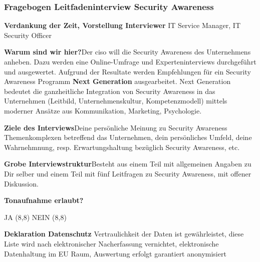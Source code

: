 \documentclass[../../main.tex]{subfiles}
\begin{document}
\subsubsection*{Fragebogen Leitfadeninterview Security Awareness}

\begin{itemize}
\setlength\itemsep{0mm}
  \item  \textbf{Verdankung der Zeit, Vorstellung Interviewer} \newline \footnotesize{IT Service Manager, IT Security Officer} \normalsize
  \item  \textbf{Warum sind wir hier?}\newline \footnotesize{Der \group \acrshort{ciso} will die Security Awareness des Unternehmens anheben. Dazu werden eine Online-Umfrage und Experteninterviews durchgeführt und ausgewertet. Aufgrund der Resultate werden Empfehlungen für ein Security Awareness Programm \textbf{Next Generation} ausgearbeitet. Next Generation bedeutet die ganzheitliche Integration von Security Awareness in das Unternehmen (Leitbild, Unternehmenskultur, Kompetenzmodell) mittels moderner Ansätze aus Kommunikation, Marketing, Psychologie.}  \normalsize
  \item \textbf{Ziele des Interviews}\newline \footnotesize{Deine persönliche Meinung zu Security Awareness Themenkomplexen betreffend das Unternehmen, dein persönliches Umfeld, deine Wahrnehmnung, resp. Erwartungshaltung bezüglich Security Awareness, etc. }  \normalsize
  \item \textbf{Grobe Interviewstruktur}\newline \footnotesize{Besteht aus einem Teil mit allgemeinen Angaben zu Dir selber und einem Teil mit fünf Leitfragen zu Security Awareness, mit offener Diskussion.}  \normalsize
  \item \textbf{Tonaufnahme erlaubt?}\newline \footnotesize{JA \framebox(8,8){}\hspace{1cm} NEIN \framebox(8,8){}  \normalsize 
  \item \textbf{Deklaration Datenschutz} \newline \footnotesize{Vertraulichkeit der Daten ist gewährleistet, diese Liste wird nach elektronischer Nacherfassung vernichtet,  elektronische Datenhaltung im EU Raum, Auswertung erfolgt garantiert anonymisiert} }
\end{itemize}
\end{document}
